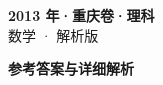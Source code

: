 \documentclass[zihao=-4, a4paper]{ctexart}
\begin{document}
\begin{center}
  {\Large\bfseries 2013 年·重庆卷·理科}\\[4pt]
  {\large 数学 · 解析版}
\end{center}
\medskip
{}

\clearpage
{}
\begin{center}{\Large\bfseries 参考答案与详细解析}\end{center}
\medskip

\end{document}
